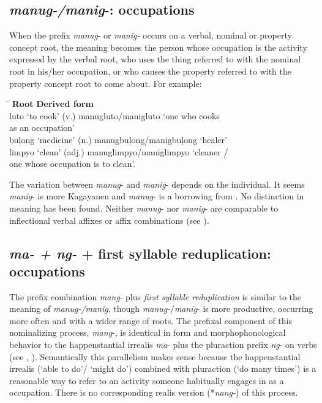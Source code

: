 \subsection{\textit{manug-/manig}-: occupations}
\label{sec:manug}

When the prefix \textit{manug}{}- or \textit{manig-} occurs on a verbal, nominal or property concept root, the meaning becomes the person whose occupation is the activity expressed by the verbal root, who uses the thing referred to with the nominal root in his/her occupation, or who causes the property referred to with the property concept root to come about. For example:

\ea
\begin{tabbing}
\hspace{3.5cm} \= \kill
\textbf{Root} \> \textbf{Derived form} \\
luto ‘to cook’ (v.) \> manugluto/manigluto ‘one who cooks \\
 \> as an occupation’ \\
buļong ‘medicine’ (n.) \> manugbuļong/manigbuļong ‘healer’ \\
limpyo ‘clean’ (adj.) \> manuglimpyo/maniglimpyo ‘cleaner / \\
\> one whose occupation is to clean’.
\end{tabbing}
\z

The variation between \textit{manug}{}- and \textit{manig}{}- depends on the individual. It seems \textit{manig}{}- is more Kagayanen and \textit{manug}{}- is a borrowing from . No distinction in meaning has been found. Neither \textit{manug}{}- nor \textit{manig}{}- are comparable to inflectional verbal affixes or affix combinations (see ).

\subsection{\textit{ma- + ng-} + first syllable reduplication: occupations}
\label{sec:ma-ng}

The prefix combination \textit{mang}{}- plus \textit{first syllable reduplication} is similar to the meaning of \textit{manug-/manig}, though \textit{manug}{}-/\textit{manig}{}- is more productive, occurring more often and with a wider range of roots. The prefixal component of this nominalizing process, \textit{mang}{}-, is identical in form and morphophonological behavior to the happenstantial irrealis \textit{ma}{}- plus the pluraction prefix \textit{ng}{}- on verbs (see , ). Semantically this parallelism makes sense because the happenstantial irrealis (‘able to do’/ ‘might do’) combined with pluraction (‘do many times’) is a reasonable way to refer to an activity someone habitually engages in as a occupation. There is no corresponding realis version (*\textit{nang-}) of this process.

